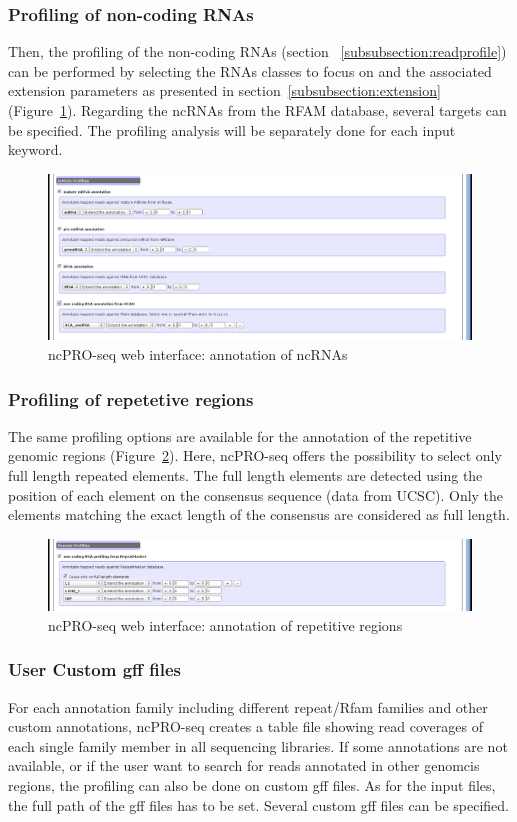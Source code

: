 \documentclass[12pt]{article}
\def \ncpip{ncPRO-seq}
\begin{document}
\subsubsection{Profiling of non-coding RNAs}
Then, the profiling of the non-coding RNAs (section ~\ref{subsubsection:readprofile}) can be performed by selecting the RNAs classes to focus on and the associated extension parameters as presented in section~\ref{subsubsection:extension} (Figure~\ref{fig:web3}).
Regarding the ncRNAs from the RFAM database, several targets can be specified. The profiling analysis will be separately done for each input keyword.\\
\begin{figure}[!h]
\includegraphics[width=\textwidth]{web_4.png}
\caption{\ncpip{} web interface: annotation of ncRNAs}
\label{fig:web3}
\end{figure} 
\subsubsection{Profiling of repetetive regions}
The same profiling options are available for the annotation of the repetitive genomic regions (Figure~\ref{fig:web5}). Here, \ncpip{} offers the possibility to select only full length repeated elements. The full length elements are detected using the position of each element on the consensus sequence (data from UCSC). Only the elements matching the exact length of the consensus are considered as full length. 
\begin{figure}[!h]
\includegraphics[width=\textwidth]{web_5.png}
\caption{\ncpip{} web interface: annotation of repetitive regions}
\label{fig:web5}
\end{figure}
\subsubsection{User Custom gff files}
For each annotation family including different repeat/Rfam families and other custom annotations, \ncpip{} creates a table file showing read coverages of each single family member in all sequencing libraries. If some annotations are not available, or if the user want to search for reads annotated in other genomcis regions, the profiling can also be done on custom gff files. As for the input files, the full path of the gff files has to be set. Several custom gff files can be specified.
\end{document}
